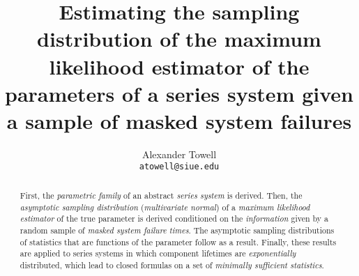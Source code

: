 \documentclass[
    11pt,
    extrafontsizes,
    article,
    oldfontcommands,
    final,
    oneside,
    openany,
    hidelinks]{memoir}
\title{Estimating the sampling distribution of the maximum likelihood estimator of the parameters of a series system given a sample of masked system failures}
\author{Alexander Towell\\\texttt{atowell@siue.edu}}
\date{}
\begin{document}
\maketitle

\begin{abstract}
First, the \emph{parametric family} of an abstract \emph{series system} is derived. Then, the \emph{asymptotic sampling distribution} (\emph{multivariate normal}) of a \emph{maximum likelihood estimator} of the true parameter is derived conditioned on the \emph{information} given by a random sample of \emph{masked system failure times}. The asymptotic sampling distributions of statistics that are functions of the parameter follow as a result. Finally, these results are applied to series systems in which component lifetimes are \emph{exponentially} distributed, which lead to closed formulas on a set of \emph{minimally sufficient statistics}.
\end{abstract}

\tableofcontents


%
%
%

%
%
%
%


%
\end{document}
